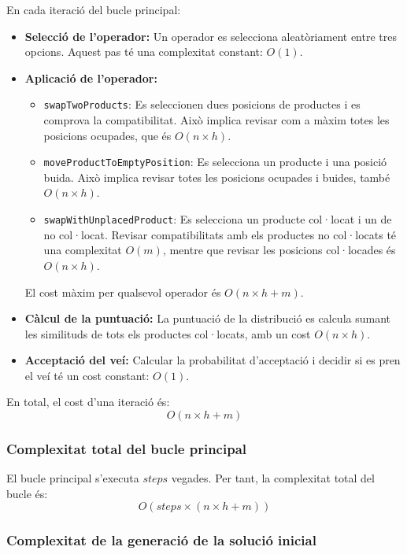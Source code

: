 \documentclass[a4paper,12pt]{report}
\begin{document}
En cada iteració del bucle principal:
\begin{itemize}
    \item \textbf{Selecció de l'operador:} Un operador es selecciona aleatòriament entre tres opcions. Aquest pas té una complexitat constant: \(O(1)\).
    \item \textbf{Aplicació de l'operador:} 
    \begin{itemize}
        \item \texttt{swapTwoProducts}: Es seleccionen dues posicions de productes i es comprova la compatibilitat. Això implica revisar com a màxim totes les posicions ocupades, que és \(O(n \times h)\).
        \item \texttt{moveProductToEmptyPosition}: Es selecciona un producte i una posició buida. Això implica revisar totes les posicions ocupades i buides, també \(O(n \times h)\).
        \item \texttt{swapWithUnplacedProduct}: Es selecciona un producte col·locat i un de no col·locat. Revisar compatibilitats amb els productes no col·locats té una complexitat \(O(m)\), mentre que revisar les posicions col·locades és \(O(n \times h)\).
    \end{itemize}
    El cost màxim per qualsevol operador és \(O(n \times h + m)\).
    \item \textbf{Càlcul de la puntuació:} La puntuació de la distribució es calcula sumant les similituds de tots els productes col·locats, amb un cost \(O(n \times h)\).
    \item \textbf{Acceptació del veí:} Calcular la probabilitat d'acceptació i decidir si es pren el veí té un cost constant: \(O(1)\).
\end{itemize}

En total, el cost d'una iteració és:
\[
O(n \times h + m)
\]

\subsubsection{Complexitat total del bucle principal}

El bucle principal s'executa \(steps\) vegades. Per tant, la complexitat total del bucle és:
\[
O(steps \times (n \times h + m))
\]

\subsubsection{Complexitat de la generació de la solució inicial}
\end{document}
